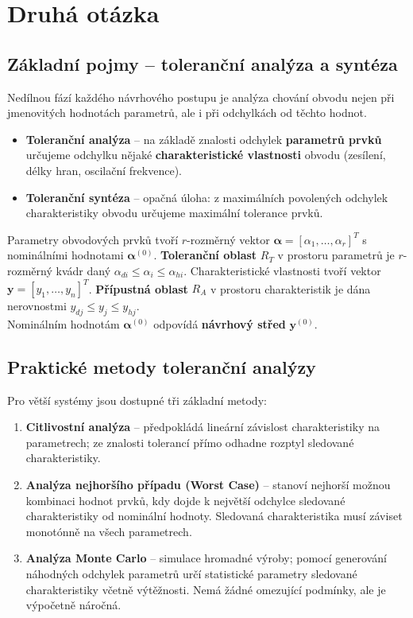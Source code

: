 \newpage
\chapter{Druhá otázka}

\section{Základní pojmy -- toleranční analýza a syntéza}
Nedílnou fází každého návrhového postupu je analýza chování obvodu nejen při jmenovitých hodnotách parametrů, ale i při odchylkách od těchto hodnot.
\begin{itemize}
    \item \textbf{Toleranční analýza} -- na základě znalosti odchylek \textbf{parametrů prvků} určujeme odchylku nějaké \textbf{charakteristické vlastnosti} obvodu (zesílení, délky hran, oscilační frekvence).
    \item \textbf{Toleranční syntéza} -- opačná úloha: z maximálních povolených odchylek charakteristiky obvodu určujeme maximální tolerance prvků.
\end{itemize}
Parametry obvodových prvků tvoří $r$-rozměrný vektor $\boldsymbol{\alpha} = [\alpha_1, \ldots, \alpha_r]^T$ s nominálními hodnotami $\boldsymbol{\alpha}^{(0)}$. \textbf{Toleranční oblast} $R_T$ v prostoru parametrů je $r$-rozměrný kvádr daný $\alpha_{di} \le \alpha_i \le \alpha_{hi}$.
Charakteristické vlastnosti tvoří vektor $\mathbf{y} = [y_1, \ldots, y_n]^T$. \textbf{Přípustná oblast} $R_A$ v prostoru charakteristik je dána nerovnostmi $y_{dj} \le y_j \le y_{hj}$.\\
Nominálním hodnotám $\boldsymbol{\alpha}^{(0)}$ odpovídá \textbf{návrhový střed} $\mathbf{y}^{(0)}$.

\section{Praktické metody toleranční analýzy}
Pro větší systémy jsou dostupné tři základní metody:
\begin{enumerate}
    \item \textbf{Citlivostní analýza} -- předpokládá lineární závislost charakteristiky na parametrech; ze znalosti tolerancí přímo odhadne rozptyl sledované charakteristiky.
    \item \textbf{Analýza nejhoršího případu (Worst Case)} -- stanoví nejhorší možnou kombinaci hodnot prvků, kdy dojde k největší odchylce sledované charakteristiky od nominální hodnoty. Sledovaná charakteristika musí záviset monotónně na všech parametrech.
    \item \textbf{Analýza Monte Carlo} -- simulace hromadné výroby; pomocí generování náhodných odchylek parametrů určí statistické parametry sledované charakteristiky včetně výtěžnosti. Nemá žádné omezující podmínky, ale je výpočetně náročná.
\end{enumerate}

